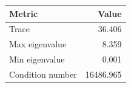 \begin{tabular}{lr}
\toprule
Metric & Value \\
\midrule
Trace & 36.406 \\
Max eigenvalue & 8.359 \\
Min eigenvalue & 0.001 \\
Condition number & 16486.965 \\
\bottomrule
\end{tabular}
